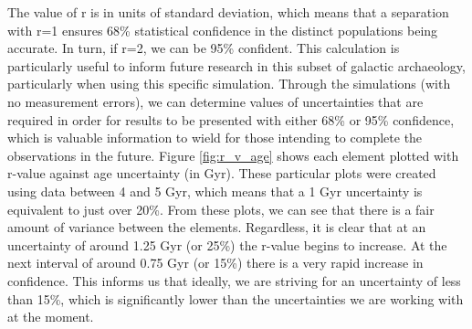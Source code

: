 \documentclass[fleqn,usenatbib]{mnras}
\begin{document}

The value of r is in units of standard deviation, which means that a separation with r=1 ensures 68\% statistical confidence in the distinct populations being accurate. In turn, if r=2, we can be 95\% confident.
This calculation is particularly useful to inform future research in this subset of galactic archaeology, particularly when using this specific simulation. Through the simulations (with no measurement errors), we can determine values of uncertainties that are required in order for results to be presented with either 68\% or 95\% confidence, which is valuable information to wield for those intending to complete the observations in the future.  
Figure \ref{fig:r_v_age} shows each element plotted with r-value against age uncertainty (in Gyr). These particular plots were created using data between 4 and 5 Gyr, which means that a 1 Gyr uncertainty is equivalent to just over 20\%. From these plots, we can see that there is a fair amount of variance between the elements. Regardless, it is clear that at an uncertainty of around 1.25 Gyr (or 25\%) the r-value begins to increase. At the next interval of around 0.75 Gyr (or 15\%) there is a very rapid increase in confidence. This informs us that ideally, we are striving for an uncertainty of less than 15\%, which is significantly lower than the uncertainties we are working with at the moment. 
 
\end{document}

